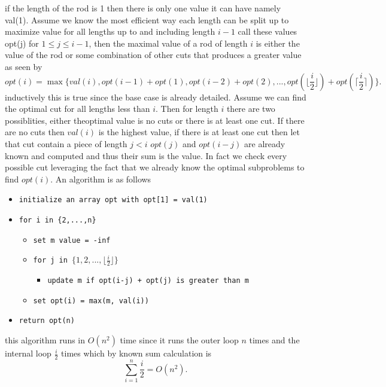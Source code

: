 \documentclass{amsart}
\begin{document}
if the length of the rod is 1 then there is only one value it can have namely val(1).
Assume we know the most efficient way each length can be split up to maximize value for all lengths up to and including length $i-1$ call these values
opt(j) for $1 \le j \le i-1$, then
the maximal value of a rod of length $i$ is either the value of the rod or some combination of other cuts that produces a greater value as seen by
\[
    opt(i) = \max\{val(i), opt(i-1) + opt(1), opt(i-2) + opt(2), ..., opt(\lfloor \frac{i}{2} \rfloor) + opt(\lceil \frac{i}{2} \rceil)\}
.\] 
inductively this is true since the base case is already detailed. Assume we can find the optimal cut for all lengths less than $i$. Then for length $i$ there
are two possiblities, either theoptimal value is no cuts or there is at least one cut. If there are no cuts then $val(i)$ is the highest value, if there is at least one cut
then let that cut contain a piece of length $j < i$ $opt(j)$ and $opt(i-j)$ are already known and computed and thus their sum is the value. In fact we check every possible cut leveraging
the fact that we already know the optimal subproblems to find $opt(i)$.
An algorithm is as follows
{\small
    \begin{itemize}
        \item \texttt{initialize an array opt with opt[1] = val(1)}
        \item \texttt{for i in \{2,...,n\}}
            \begin{itemize}
                \item \texttt{set m value = -inf}
                \item \texttt{for j in $\{1,2,...,\lfloor \frac{i}{2} \rfloor\}$}
                    \begin{itemize}
                        \item \texttt{update m if opt(i-j) + opt(j) is greater than m}
                    \end{itemize}
                \item \texttt{set opt(i) = max(m, val(i))}
            \end{itemize}
        \item \texttt{return opt(n)}
    \end{itemize}
}
this algorithm runs in $O(n^2)$ time since it runs the outer loop $n$ times and the internal loop $\frac{i}{2}$ times which by known sum calculation
is
\[
\sum_{i=1}^{n}\frac{i}{2} = O(n^2)
.\] 
\end{document}
